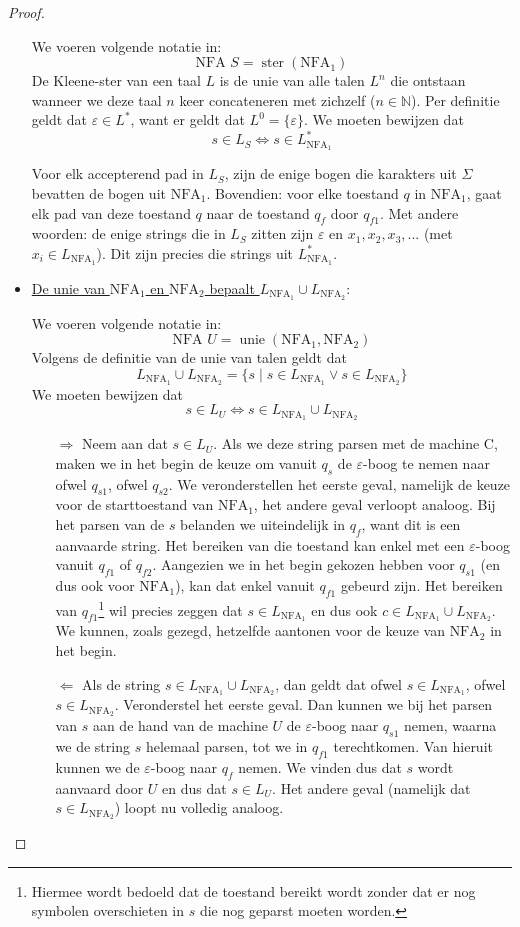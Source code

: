 \documentclass[kulak]{kulakarticle}
\newcommand{\N}{\mathbb{N}}
\newcommand{\NFA}{\text{NFA}}
\newcommand{\epsilonboog}{\( \varepsilon \)-boog }
\let\epsilon\varepsilon
\theoremstyle{definition}
\begin{document}
\begin{proof}
\begin{itemize}
			We voeren volgende notatie in: \[ \text{NFA } S = \operatorname*{ster}(\NFA_{1}) \] De Kleene-ster van een taal \( L \) is de unie van alle talen \(L^n\) die ontstaan wanneer we deze taal \( n \) keer concateneren met zichzelf (\(n \in \N\)). Per definitie geldt dat \(\varepsilon \in L^*\), want er geldt dat \( L^0=\{\varepsilon\} \). We moeten bewijzen dat \[ s \in L_{S} \Leftrightarrow s \in L_{\NFA_1}^* \]

			Voor elk accepterend pad in \( L_S \), zijn de enige bogen die karakters uit \( \Sigma \) bevatten de bogen uit \(\NFA_1\). Bovendien: voor elke toestand \(q\) in \(\NFA_1\), gaat elk pad van deze toestand \(q\) naar de toestand \(q_f\) door \(q_{f1}\). Met andere woorden: de enige strings die in \(L_S\) zitten zijn \( \epsilon \) en \( x_1, x_2,x_3, ...\) (met \(x_i \in L_{\NFA_1} \)). Dit zijn precies die strings uit \( L_{\NFA_1}^* \).

			\item \underline{De unie van \( \NFA_1 \) en \( \NFA_2 \) bepaalt \( L_{\NFA_1} \cup L_{\NFA_2} \)}:

			We voeren volgende notatie in: \[ \text{NFA } U = \operatorname*{unie}(\NFA_{1},\NFA_{2}) \] Volgens de definitie van de unie van talen geldt dat \[ L_{\NFA_1} \cup L_{\NFA_2}=\{s \mid s \in L_{\NFA_1} \lor s \in L_{\NFA_2}\} \] We moeten bewijzen dat \[ s \in L_{U} \Leftrightarrow s \in L_{\NFA_1} \cup L_{\NFA_2} \]
			\begin{enumerate}
				\item[\( \Rightarrow \)] Neem aan dat \( s \in L_U \). Als we deze string parsen met de machine C, maken we in het begin de keuze om vanuit \( q_s \) de \epsilonboog te nemen naar ofwel \( q_{s1} \), ofwel \( q_{s2} \). We veronderstellen het eerste geval, namelijk de keuze voor de starttoestand van \(\NFA_1\), het andere geval verloopt analoog. Bij het parsen van de \( s \) belanden we uiteindelijk in \( q_f \), want dit is een aanvaarde string. Het bereiken van die toestand kan enkel met een \epsilonboog vanuit \( q_{f1} \) of \( q_{f2} \). Aangezien we in het begin gekozen hebben voor \( q_{s1} \) (en dus ook voor \( \NFA_1 \)), kan dat enkel vanuit \( q_{f1} \) gebeurd zijn. Het bereiken van \(q_{f1}\)\footnote{Hiermee wordt bedoeld dat de toestand bereikt wordt zonder dat er nog symbolen overschieten in \( s \) die nog geparst moeten worden.} wil precies zeggen dat \(s \in L_{\NFA_1}\) en dus ook \( c \in L_{\NFA_1} \cup L_{\NFA_2} \). We kunnen, zoals gezegd, hetzelfde aantonen voor de keuze van \( \NFA_2 \) in het begin.
				\item[\(\Leftarrow\)] Als de string \( s \in L_{\NFA_1} \cup L_{\NFA_2} \), dan geldt dat ofwel \( s \in L_{\NFA_1} \), ofwel \( s \in L_{\NFA_2} \). Veronderstel het eerste geval. Dan kunnen we bij het parsen van \( s \) aan de hand van de machine \( U \) de \epsilonboog naar \(q_{s1}\) nemen, waarna we de string \(s\) helemaal parsen, tot we in \(q_{f1}\) terechtkomen. Van hieruit kunnen we de \epsilonboog naar \(q_f\) nemen. We vinden dus dat \(s\) wordt aanvaard door \(U\) en dus dat \(s \in L_U\). Het andere geval (namelijk dat \(s \in L_{\NFA_2}\)) loopt nu volledig analoog.
			\end{enumerate}


\end{itemize}
\end{proof}
\end{document}
